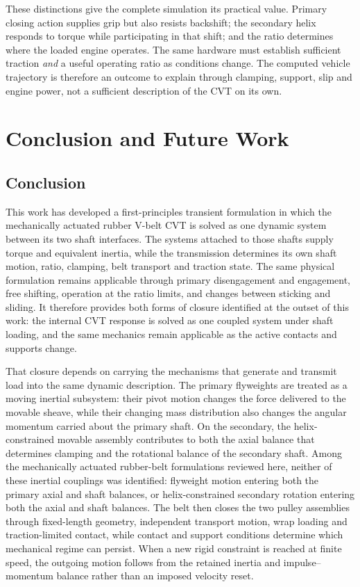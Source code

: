 \documentclass[11pt]{report}
\numberwithin{equation}{section}
\begin{document}
These distinctions give the complete simulation its practical value.
Primary closing action supplies grip but also resists backshift;
the secondary helix responds to torque while participating in that
shift; and the ratio determines where the loaded engine operates.
The same hardware must establish sufficient traction \emph{and}
a useful operating ratio as conditions change. The computed
vehicle trajectory is therefore an outcome to explain through
clamping, support, slip and engine power, not a sufficient
description of the CVT on its own.

\chapter{Conclusion and Future Work}
\label{sec:conclusion_and_future_work}

\section{Conclusion}
\label{sec:conclusion}

This work has developed a first-principles transient formulation in which the mechanically
actuated rubber V-belt CVT is solved as one dynamic system between its two shaft interfaces.
The systems attached to those shafts supply torque and equivalent inertia, while the
transmission determines its own shaft motion, ratio, clamping, belt transport and traction
state. The same physical formulation remains applicable through primary disengagement and
engagement, free shifting, operation at the ratio limits, and changes between sticking and
sliding. It therefore provides both forms of closure identified at the outset of this work:
the internal CVT response is solved as one coupled system under shaft loading, and the same
mechanics remain applicable as the active contacts and supports change.

That closure depends on carrying the mechanisms that generate and transmit load into the
same dynamic description. The primary flyweights are treated as a moving inertial subsystem:
their pivot motion changes the force delivered to the movable sheave, while their changing
mass distribution also changes the angular momentum carried about the primary shaft. On the
secondary, the helix-constrained movable assembly contributes to both the axial balance that
determines clamping and the rotational balance of the secondary shaft. Among the mechanically 
actuated rubber-belt formulations reviewed here, neither of these inertial couplings was 
identified: flyweight motion entering both the primary axial and shaft balances, or 
helix-constrained secondary rotation entering both the axial and shaft balances. The belt 
then closes the two pulley assemblies through fixed-length
geometry, independent transport motion, wrap loading and traction-limited contact, while
contact and support conditions determine which mechanical regime can persist. When a new
rigid constraint is reached at finite speed, the outgoing motion follows from the retained
inertia and impulse--momentum balance rather than an imposed velocity reset.
\end{document}
